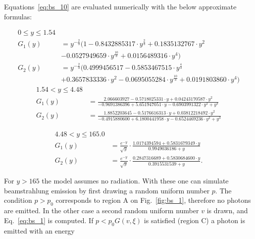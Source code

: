Equations~\ref{eq:bs_10} are evaluated numerically with the below approximate formulas:

\begin{equation}
	\begin{split}
	0 \leq y \leq 1.54 & \\
	G_1(y) & = y^{-\frac{2}{3}} (1 - 0.8432885317\cdot y^{\frac{2}{3}} + 0.1835132767\cdot y^2 \\
	& - 0.0527949659\cdot y^{\frac{10}{3}} + 0.0156489316\cdot y^4) \\
	G_2(y) & = y^{-\frac{2}{3}} (0.4999456517 - 0.5853467515\cdot y^{\frac{4}{3}} \\
	& + 0.3657833336\cdot y^2 - 0.0695055284\cdot y^{\frac{10}{3}} + 0.0191803860\cdot y^4) 	\end{split}
\label{eq:bs_11}
\end{equation}
\begin{equation}
	\begin{split}
	1.54 < y \leq 4.48 & \\	
	G_1(y) & = \frac{2.066603927 - 0.5718025331\cdot y + 0.04243170587\cdot y^2}{-0.9691386396 + 5.651947051\cdot y - 0.6903991322\cdot y^2 + y^3} \\
	G_2(y) & = \frac{1.8852203645 - 0.5176616313\cdot y + 0.03812218492\cdot y^2}{-0.4915880600 + 6.1800441958\cdot y - 0.6524469236\cdot y^2 + y^3}
	\end{split}
\label{eq:bs_12}
\end{equation}

\begin{equation}
\begin{split}
	4.48 < y \leq 165.0 & \\	
	G_1(y) & = 	\frac{e^{-y}}{\sqrt{y}}\cdot \frac{1.0174394594 + 0.5831679349\cdot y}{0.9949036186 + y} \\
	G_2(y) & = \frac{e^{-y}}{\sqrt{y}}\cdot \frac{0.2847316689 + 0.5830684600\cdot y}{0.3915531539 + y}.
	\end{split}
 	\label{eq:bs_13}
\end{equation}

For $y>165$ the model assumes no radiation. With these one can simulate beamstrahlung emission by first drawing a random uniform number $p$. The condition $p>p_0$ corresponds to region A on Fig.~\ref{fig:bs_1}, therefore no photons are emitted. In the other case a second random uniform number $v$ is drawn, and Eq.~\ref{eq:bs_1} is computed. If $p<p_0G(v,\xi)$ is satisfied (region C) a photon is emitted with an energy

